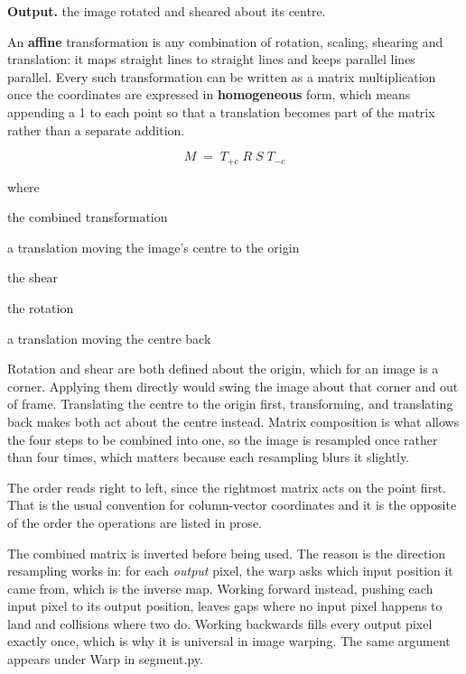 \noindent\textbf{Output.} the image rotated and sheared about its centre.


An \textbf{affine} transformation is any combination of rotation, scaling, shearing and translation: it maps straight lines to straight lines and keeps parallel lines parallel. Every such transformation can be written as a matrix multiplication once the coordinates are expressed in \textbf{homogeneous} form, which means appending a 1 to each point so that a translation becomes part of the matrix rather than a separate addition.



\begin{equation}
M \;=\; T_{+c} \; R \; S \; T_{-c}
\end{equation}

\noindent where
\begin{description}[leftmargin=2.4em,style=nextline,font=\normalfont\ttfamily]\setlength\itemsep{1pt}
  \item[{$M$}] \normalfont the combined transformation
  \item[{$T_{-c}$}] \normalfont a translation moving the image's centre to the origin
  \item[{$S$}] \normalfont the shear
  \item[{$R$}] \normalfont the rotation
  \item[{$T_{+c}$}] \normalfont a translation moving the centre back
\end{description}
Rotation and shear are both defined about the origin, which for an image is a corner. Applying them directly would swing the image about that corner and out of frame. Translating the centre to the origin first, transforming, and translating back makes both act about the centre instead. Matrix composition is what allows the four steps to be combined into one, so the image is resampled once rather than four times, which matters because each resampling blurs it slightly.

The order reads right to left, since the rightmost matrix acts on the point first. That is the usual convention for column-vector coordinates and it is the opposite of the order the operations are listed in prose.


The combined matrix is inverted before being used. The reason is the direction resampling works in: for each \emph{output} pixel, the warp asks which input position it came from, which is the inverse map. Working forward instead, pushing each input pixel to its output position, leaves gaps where no input pixel happens to land and collisions where two do. Working backwards fills every output pixel exactly once, which is why it is universal in image warping. The same argument appears under Warp in segment.py.



